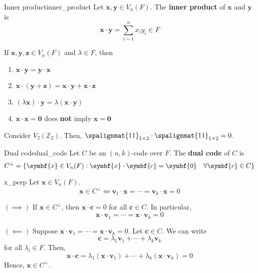 \begin{Definition}{Inner product}{inner_product}
    Let $ \symbf{x},\symbf{y}\in V_n(F) $. The \textbf{inner product}
    of $ \symbf{x} $ and $ \symbf{y} $ is
    \[ \symbf{x}\cdot \symbf{y}=\sum\limits_{i=1}^{n} x_i y_i\in F \]
\end{Definition}

\begin{Theorem}{}{}
    If $ \symbf{x},\symbf{y},\symbf{z}\in V_n(F) $ and $ \lambda\in F $, then
    \begin{enumerate}[label=(\arabic*)]
        \item $ \symbf{x}\cdot \symbf{y}=\symbf{y}\cdot \symbf{x} $
        \item $ \symbf{x}\cdot (\symbf{y}+\symbf{z})=\symbf{x}\cdot \symbf{y}+\symbf{x}\cdot \symbf{z} $
        \item $ (\lambda \symbf{x})\cdot \symbf{y}=\lambda(\symbf{x}\cdot \symbf{y}) $
        \item $ \symbf{x}\cdot \symbf{x}=\symbf{0}$ does \textbf{not} imply $ \symbf{x}=\symbf{0} $
    \end{enumerate}
\end{Theorem}

\begin{Example}{}{}
    Consider $ V_2(\mathbb{Z}_2) $. Then,
    $ \spalignmat{1 1}_{1\times 2}\cdot\spalignmat{1 1}_{1\times 2}=0 $.
\end{Example}

\begin{Definition}{Dual code}{dual_code}
    Let $ C $ be an $ (n,k) $-code over $ F $. The \textbf{dual code}
    of $ C $ is
    \[ C^{\perp}=\set{\symbf{x}\in V_n(F):\symbf{x}\cdot \symbf{c}=\symbf{0}\quad\forall \symbf{c}\in C} \]
\end{Definition}

\begin{Theorem}{}{x_perp}
    Let $ \symbf{x}\in V_n(F) $.
    \[ \symbf{x}\in C^{\perp}\iff \symbf{v}_1\cdot \symbf{x}=\cdots =\symbf{v}_k\cdot \symbf{x}=0 \]
\end{Theorem}

\begin{Proof}{}{}
    $ (\implies) $ If $ \symbf{x}\in C^{\perp} $, then $ \symbf{x}\cdot \symbf{c}=0 $ for all
    $ \symbf{c}\in C $. In particular,
    \[ \symbf{x}\cdot \symbf{v}_1=\cdots =\symbf{x}\cdot \symbf{v}_k=0 \]

    $ (\impliedby) $ Suppose $ \symbf{x}\cdot \symbf{v}_1=\cdots =\symbf{x}\cdot \symbf{v}_k=0 $. Let $ \symbf{c}\in C $.
    We can write
    \[ \symbf{c}=\lambda_1\symbf{v}_1+\cdots+\lambda_k\symbf{v}_k \]
    for all $ \lambda_i\in F $. Then,
    \[ \symbf{x}\cdot \symbf{c}=\lambda_1(\symbf{x}\cdot \symbf{v}_1)+\cdots+\lambda_k(\symbf{x}\cdot \symbf{v}_k)=0 \]
    Hence, $ \symbf{x}\in C^{\perp} $.
\end{Proof}

